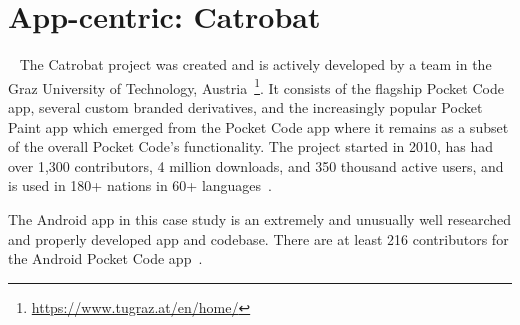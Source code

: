

\section{App-centric: Catrobat}~\label{case-study-overview-catrobat}
The Catrobat project was created and is actively developed by a team in the Graz University of Technology, Austria~\footnote{\url{https://www.tugraz.at/en/home/}}. It consists of the flagship Pocket Code app, several custom branded derivatives, and the increasingly popular Pocket Paint app which emerged from the Pocket Code app where it remains as a subset of the overall Pocket Code's functionality. The project started in 2010, has had over 1,300 contributors, 4 million downloads, and 350 thousand active users, and is used in 180+ nations in 60+ languages~.

The Android app in this case study is an extremely and unusually well researched and properly developed app and codebase.  There are at least 216 contributors for the Android Pocket Code app~.

